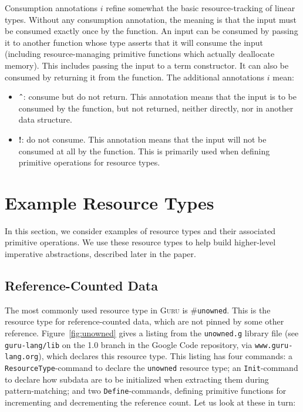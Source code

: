 \documentclass[9pt,natbib]{sigplanconf}
\begin{document}
Consumption annotations $i$ refine somewhat the basic
resource-tracking of linear types.  Without any consumption
annotation, the meaning is that the input must be consumed exactly
once by the function.  An input can be consumed by passing it to
another function whose type asserts that it will consume the input
(including resource-managing primitive functions which actually
deallocate memory).  This includes passing the input to a term
constructor.  It can also be consumed by returning it from the
function.  The additional annotations $i$ mean:

\begin{itemize}

\item \textbf{\^{\ }}: consume but do not return.  This annotation
  means that the input is to be consumed by the function, but not
  returned, neither directly, nor in another data structure.

\item \textbf{!}: do not consume.  This annotation means that the
  input will not be consumed at all by the function.  This is
  primarily used when defining primitive operations for resource
  types.

\end{itemize}

\section{Example Resource Types}

In this section, we consider examples of resource types and their
associated primitive operations.  We use these resource types to
help build higher-level imperative abstractions, described later
in the paper.

\subsection{Reference-Counted Data}

The most commonly used resource type in \textsc{Guru} is
\#\texttt{unowned}.  This is the resource type for reference-counted
data, which are not pinned by some other reference.
Figure~\ref{fig:unowned} gives a listing from the \texttt{unowned.g}
library file (see \texttt{guru-lang/lib} on the 1.0 branch in the
Google Code repository, via \texttt{www.guru-lang.org}), which
declares this resource type.  This listing has four commands: a
\texttt{ResourceType}-command to declare the \texttt{unowned} resource
type; an \texttt{Init}-command to declare how subdata are to be
initialized when extracting them during pattern-matching; and two
\texttt{Define}-commands, defining primitive functions for
incrementing and decrementing the reference count.  Let us look at
these in turn:
\end{document}
